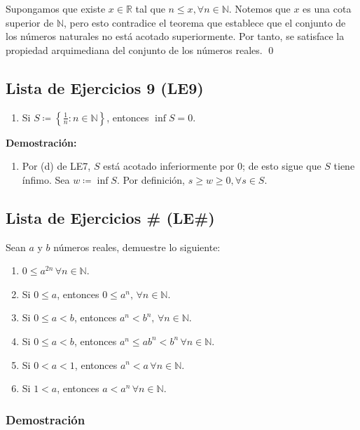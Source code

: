 \documentclass[11pt]{article}
\newcommand{\N}{\mathbb{N}}
\newcommand{\R}{\mathbb{R}}
\def\defined #1{\coloneqq \left\{#1\right\}}
\begin{document}
Supongamos que existe $x\in \R$ tal que $n\leq x, \forall n\in \N$. Notemos que $x$ es una cota superior de $\N$, pero esto contradice el teorema que establece que el conjunto de los números naturales no está acotado superiormente. Por tanto, se satisface la propiedad arquimediana del conjunto de los números reales. \qed

\subsection*{Lista de Ejercicios 9 (LE9)}

\begin{enumerate}[label=\alph*)]
    \item Si $S \defined{\frac{1}{n}: n\in \N}$, entonces $\inf{S=0}$.
\end{enumerate}

\textbf{Demostración:}

\begin{enumerate}[label=\alph*)]
    \item Por (d) de LE7, $S$ está acotado inferiormente por $0$; de esto sigue que $S$ tiene ínfimo. Sea $w\coloneqq \inf{S}$. Por definición, $s\geq w\geq 0, \forall s\in S$.
\end{enumerate}

\subsection*{Lista de Ejercicios \# (LE\#)}

Sean $a$ y $b$ números reales, demuestre lo siguiente:

\begin{enumerate}[label=\alph*),font=\bfseries]
    \item $0 \leq a^{2n} \, \forall n\in \N$.
    \item Si $0\leq a$, entonces $ 0 \leq a^n, \, \forall n\in \N$.
    \item Si $0 \leq a <b$, entonces $a^n < b^n, \, \forall n\in \N$.
    \item Si $0 \leq a <b$, entonces $a^n \leq ab^n < b^n \, \forall n\in \N$.
    \item Si $0<a<1$, entonces $a^n<a \, \forall n\in \N$.
    \item Si $1<a$, entonces $a<a^n \, \forall n\in \N$.
\end{enumerate}

\subsubsection*{Demostración}
\end{document}
